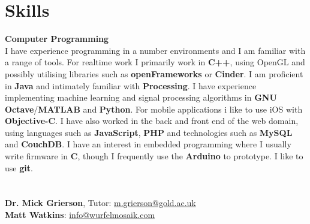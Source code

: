 \documentclass[margin,line,a4paper]{resume}
\begin{document}
\begin{resume}
\section{\mysidestyle Skills}

\textbf{Computer Programming} \vspace{1mm} \\
I have experience programming in a number environments and I am familiar with a range of tools. For realtime work I primarily work in \textbf{C{\footnotesize++}}, using OpenGL and possibly utilising libraries such as \textbf{openFrameworks} or \textbf{Cinder}. I am proficient in \textbf{Java} and intimately familiar with \textbf{Processing}. I have experience implementing machine learning and signal processing algorithms in \textbf{GNU Octave}/\textbf{MATLAB} and \textbf{Python}. For mobile applications i like to use iOS with  \textbf{Objective-C}. I have also worked in the back and front end of the web domain, using languages such as  \textbf{JavaScript}, \textbf{PHP} and technologies such as \textbf{MySQL} and \textbf{CouchDB}. I have an interest in embedded programming where I usually write firmware in \textbf{C}, though I frequently use the \textbf{Arduino} to prototype. I like to use \textbf{git}.

\section{}

\hypersetup{urlcolor=Fuchsia}
%
\textbf{Dr. Mick Grierson}, Tutor: \href{mailto:m.grierson@gold.ac.uk}{m.grierson@gold.ac.uk}
\vspace{2mm} \\
\textbf{Matt Watkins}: \href{info@wurfelmosaik.com}{info@wurfelmosaik.com}
\vspace{2mm} \\

\end{resume}
\end{document}
